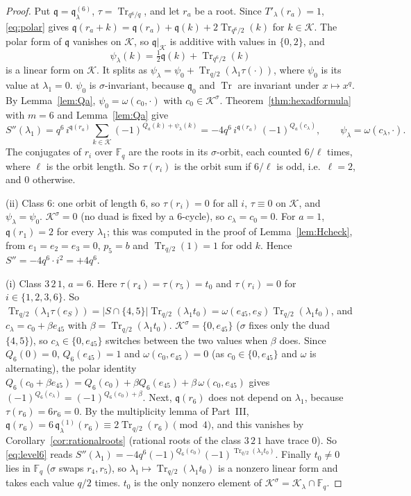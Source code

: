 \documentclass[12pt,a4paper]{amsart}
\theoremstyle{definition}
\newcommand{\F}{\mathbb{F}}
\newcommand{\Tr}{\operatorname{Tr}}
\newcommand{\Kk}{\mathcal{K}}
\newcommand{\qq}{\mathfrak{q}}
\newcommand{\Spp}{S''}
\begin{document}
\begin{proof}
Put $\qq=\qq^{(6)}_\lambda$, $\tau=\Tr_{q^6/q}$, and let $r_a$ be a root. Since $T'_\lambda(r_a)=1$, \eqref{eq:polar} gives $\qq(r_a+k)=\qq(r_a)+\qq(k)+2\Tr_{q^6/2}(k)$ for $k\in\Kk$. The polar form of $\qq$ vanishes on $\Kk$, so $\qq|_\Kk$ is additive with values in $\{0,2\}$, and
\[
\psi_\lambda(k)=\tfrac12\qq(k)+\Tr_{q^6/2}(k)
\]
is a linear form on $\Kk$. It splits as $\psi_\lambda=\psi_0+\Tr_{q/2}(\lambda_1\tau(\cdot))$, where $\psi_0$ is its value at $\lambda_1=0$. $\psi_0$ is $\sigma$-invariant, because $\qq_0$ and $\Tr$ are invariant under $x\mapsto x^q$. By Lemma~\ref{lem:Qa}, $\psi_0=\omega(c_0,\cdot)$ with $c_0\in\Kk^\sigma$. Theorem~\ref{thm:hexadformula} with $m=6$ and Lemma~\ref{lem:Qa} give
\begin{equation}\label{eq:level6}
\Spp(\lambda_1)=q^6\,i^{\qq(r_a)}\sum_{k\in\Kk}(-1)^{Q_a(k)+\psi_\lambda(k)}=-4q^6\,i^{\qq(r_a)}\,(-1)^{Q_a(c_\lambda)},\qquad \psi_\lambda=\omega(c_\lambda,\cdot).
\end{equation}
The conjugates of $r_i$ over $\F_q$ are the roots in its $\sigma$-orbit, each counted $6/\ell$ times, where $\ell$ is the orbit length. So $\tau(r_i)$ is the orbit sum if $6/\ell$ is odd, i.e.\ $\ell=2$, and $0$ otherwise.

(ii) Class $6$: one orbit of length $6$, so $\tau(r_i)=0$ for all $i$, $\tau\equiv0$ on $\Kk$, and $\psi_\lambda=\psi_0$. $\Kk^\sigma=0$ (no duad is fixed by a $6$-cycle), so $c_\lambda=c_0=0$. For $a=1$, $\qq(r_1)=2$ for every $\lambda_1$; this was computed in the proof of Lemma~\ref{lem:Hcheck}, from $e_1=e_2=e_3=0$, $p_5=b$ and $\Tr_{q/2}(1)=1$ for odd $k$. Hence $\Spp=-4q^6\cdot i^2=+4q^6$.

(i) Class $3\,2\,1$, $a=6$. Here $\tau(r_4)=\tau(r_5)=t_0$ and $\tau(r_i)=0$ for $i\in\{1,2,3,6\}$. So $\Tr_{q/2}(\lambda_1\tau(e_S))=|S\cap\{4,5\}|\Tr_{q/2}(\lambda_1t_0)=\omega(e_{45},e_S)\Tr_{q/2}(\lambda_1t_0)$, and $c_\lambda=c_0+\beta e_{45}$ with $\beta=\Tr_{q/2}(\lambda_1t_0)$. $\Kk^\sigma=\{0,e_{45}\}$ ($\sigma$ fixes only the duad $\{4,5\}$), so $c_\lambda\in\{0,e_{45}\}$ switches between the two values when $\beta$ does. Since $Q_6(0)=0$, $Q_6(e_{45})=1$ and $\omega(c_0,e_{45})=0$ (as $c_0\in\{0,e_{45}\}$ and $\omega$ is alternating), the polar identity $Q_6(c_0+\beta e_{45})=Q_6(c_0)+\beta Q_6(e_{45})+\beta\,\omega(c_0,e_{45})$ gives $(-1)^{Q_6(c_\lambda)}=(-1)^{Q_6(c_0)+\beta}$. Next, $\qq(r_6)$ does not depend on $\lambda_1$, because $\tau(r_6)=6r_6=0$. By the multiplicity lemma of Part~III, $\qq(r_6)=6\,\qq^{(1)}_\lambda(r_6)\equiv2\Tr_{q/2}(r_6)\pmod 4$, and this vanishes by Corollary~\ref{cor:rationalroots} (rational roots of the class $3\,2\,1$ have trace $0$). So \eqref{eq:level6} reads $\Spp(\lambda_1)=-4q^6(-1)^{Q_6(c_0)}(-1)^{\Tr_{q/2}(\lambda_1t_0)}$. Finally $t_0\ne0$ lies in $\F_q$ ($\sigma$ swaps $r_4,r_5$), so $\lambda_1\mapsto\Tr_{q/2}(\lambda_1t_0)$ is a nonzero linear form and takes each value $q/2$ times. $t_0$ is the only nonzero element of $\Kk^\sigma=\Kk_\lambda\cap\F_q$.
\end{proof}
\end{document}
